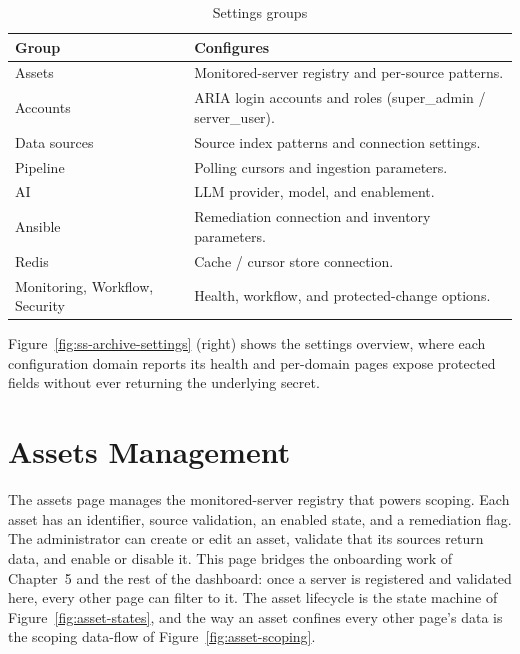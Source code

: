 \begin{table}[H]
\centering
\caption{Settings groups}
\label{tab:settings-groups}
\begin{tabularx}{\textwidth}{@{}p{}Y@{}}
\toprule
\textbf{Group} & \textbf{Configures} \\
\midrule
Assets & Monitored-server registry and per-source patterns. \\
Accounts & ARIA login accounts and roles (super\_admin / server\_user). \\
Data sources & Source index patterns and connection settings. \\
Pipeline & Polling cursors and ingestion parameters. \\
AI & LLM provider, model, and enablement. \\
Ansible & Remediation connection and inventory parameters. \\
Redis & Cache / cursor store connection. \\
Monitoring, Workflow, Security & Health, workflow, and protected-change options. \\
\bottomrule
\end{tabularx}
\end{table}

Figure~\ref{fig:ss-archive-settings} (right) shows the settings overview, where each configuration domain reports its health and per-domain pages expose protected fields without ever returning the underlying secret.


\section{Assets Management}

The assets page manages the monitored-server registry that powers scoping. Each asset has an identifier, source validation, an enabled state, and a remediation flag. The administrator can create or edit an asset, validate that its sources return data, and enable or disable it. This page bridges the onboarding work of Chapter~5 and the rest of the dashboard: once a server is registered and validated here, every other page can filter to it. The asset lifecycle is the state machine of Figure~\ref{fig:asset-states}, and the way an asset confines every other page's data is the scoping data-flow of Figure~\ref{fig:asset-scoping}.

